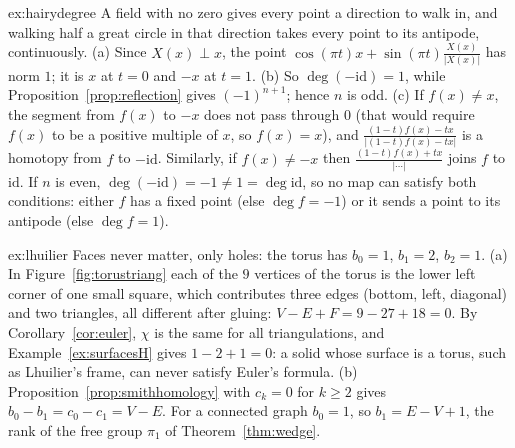 \begin{solution}{ex:hairydegree}
\idea A field with no zero gives every point a direction to walk in, and walking half a great circle in that direction takes every point to its antipode, continuously.
\writeup (a) Since $X(x)\perp x$, the point $\cos(\pi t)x+\sin(\pi t)\frac{X(x)}{|X(x)|}$ has norm $1$; it is $x$ at $t=0$ and $-x$ at $t=1$. (b) So $\deg(-\mathrm{id})=1$, while Proposition~\ref{prop:reflection} gives
$(-1)^{n+1}$; hence $n$ is odd. (c) If $f(x)\ne x$, the segment from $f(x)$ to $-x$ does not pass through $0$ (that would require $f(x)$ to be a positive multiple of $x$, so $f(x)=x$), and
$\frac{(1-t)f(x)-tx}{|(1-t)f(x)-tx|}$ is a homotopy from $f$ to $-\mathrm{id}$. Similarly, if $f(x)\ne-x$ then $\frac{(1-t)f(x)+tx}{|\cdots|}$ joins $f$ to $\mathrm{id}$. If $n$ is even, $\deg(-\mathrm{id})=-1\ne1=\deg\mathrm{id}$, so no map
can satisfy both conditions: either $f$ has a fixed point (else $\deg f=-1$) or it sends a point to its antipode (else $\deg f=1$).
\end{solution}

\begin{solution}{ex:lhuilier}
\idea Faces never matter, only holes: the torus has $b_0=1$, $b_1=2$, $b_2=1$.
\writeup (a) In Figure~\ref{fig:torustriang} each of the $9$ vertices of the torus is the lower left corner of one small square, which contributes three edges (bottom, left, diagonal) and two triangles, all
different after gluing: $V-E+F=9-27+18=0$. By Corollary~\ref{cor:euler}, $\chi$ is the same for all triangulations, and Example~\ref{ex:surfacesH} gives $1-2+1=0$: a solid whose surface is a torus, such
as Lhuilier's frame, can never satisfy Euler's formula. (b) Proposition~\ref{prop:smithhomology} with $c_k=0$ for $k\ge2$ gives $b_0-b_1=c_0-c_1=V-E$. For a connected graph $b_0=1$, so $b_1=E-V+1$, the rank of
the free group $\pi_1$ of Theorem~\ref{thm:wedge}.
\end{solution}

